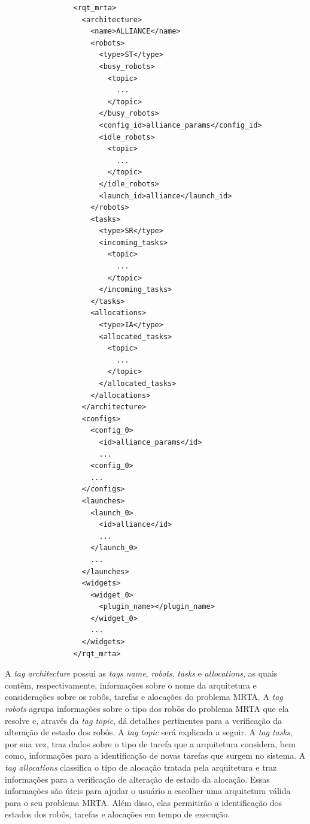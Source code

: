            \begin{lstlisting}
                <rqt_mrta>
                  <architecture>
                    <name>ALLIANCE</name>
                    <robots>
                      <type>ST</type>
                      <busy_robots>
                        <topic>
                          ...
                        </topic>
                      </busy_robots>
                      <config_id>alliance_params</config_id>
                      <idle_robots>
                        <topic>
                          ...
                        </topic>
                      </idle_robots>
                      <launch_id>alliance</launch_id>
                    </robots>
                    <tasks>
                      <type>SR</type>
                      <incoming_tasks>
                        <topic>
                          ...
                        </topic>
                      </incoming_tasks>
                    </tasks>
                    <allocations>
                      <type>IA</type>
                      <allocated_tasks>
                        <topic>
                          ...
                        </topic>
                      </allocated_tasks>
                    </allocations>
                  </architecture>
                  <configs>
                    <config_0>
                      <id>alliance_params</id>
                      ...
                    <config_0>
                    ...
                  </configs>
                  <launches>
                    <launch_0>
                      <id>alliance</id>
                      ...
                    </launch_0>
                    ...
                  </launches>
                  <widgets>
                    <widget_0>
                      <plugin_name></plugin_name>
                    </widget_0>
                    ...
                  </widgets>
                </rqt_mrta>
            \end{lstlisting}
            
            A \textit{tag architecture} possui as \textit{tags name}, \textit{robots}, \textit{tasks} e \textit{allocations}, as quais contêm, respectivamente, informações sobre o nome da arquitetura e considerações sobre os robôs, tarefas e alocações do problema MRTA. A \textit{tag robots} agrupa informações sobre o tipo dos robôs do problema MRTA que ela resolve e, através da \textit{tag topic}, dá detalhes pertinentes para a verificação da alteração de estado dos robôs. A \textit{tag topic} será explicada a seguir. A \textit{tag tasks}, por sua vez, traz dados sobre o tipo de tarefa que a arquitetura considera, bem como, informações para a identificação de novas tarefas que surgem no sistema. A \textit{tag allocations} classifica o tipo de alocação tratada pela arquitetura e traz informações para a verificação de alteração de estado da alocação. Essas informações são úteis para ajudar o usuário a escolher uma arquitetura válida para o seu problema MRTA. Além disso, elas permitirão a identificação dos estados dos robôs, tarefas e alocações em tempo de execução.
            
